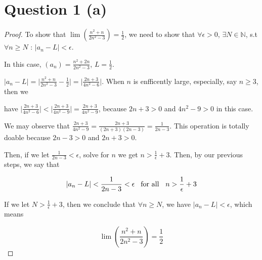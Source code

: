 \documentclass[12pt]{article}
\begin{document}
\doublespacing

\section*{Question 1 (a)}

\begin{proof}
    To show that $\displaystyle{ \lim \left( \frac{n^2+n}{2n^2-3}
    \right) = \frac{1}{2}}$, we need to show that $\forall 
    \epsilon > 0$, $\exists N \in \mathbb{N} $, s.t 
    $\forall n \geq N$ : $ \displaystyle{\vert a_n -
    L \vert < \epsilon }$. 
    
    \vspace*{0.3cm}
    In this case, 
    $\displaystyle{(a_n) = \frac{n^2+2n}{2n^2-3}}$,
    $\displaystyle{L = \frac{1}{2}}$.

    
    \vspace*{0.3cm}
    $ \displaystyle{ \vert a_n - L \vert = 
    \bigg \vert \frac{n^2+n}{2n^2-3} - \frac{1}{2} \bigg \vert = 
    \bigg \vert \frac{2n+3}{4n^2-6} \bigg \vert }$.
    When $n$ is enfficently large, especially, say $n \geq 3$,
    then we 
    
    \vspace*{0.3cm}
    have $\displaystyle{ \bigg \vert \frac{2n+3}{4n^2-6} 
    \bigg \vert < \bigg\vert \frac{2n+3}{4n^2-9} \bigg\vert
    = \frac{2n+3}{4n^2-9}}$, because $2n+3 > 0$ and $
    4n^2 - 9 > 0$ in this case.

    \vspace*{0.3cm}
    We may observe that $\displaystyle{\frac{2n+3}{4n^2-9} = \frac{2n+3}
    {(2n+3)(2n-3)} = \frac{1}{2n-3}}$. This operation is totally
    doable because $2n-3>0$ and $2n+3>0$.

    \vspace*{0.3cm}
    Then, if we let $\displaystyle{\frac{1}{2n-3} < \epsilon}$,
    solve for $n$ we get $\displaystyle{ n >
    \frac{1}{\epsilon} + 3}$. Then, by our previous steps,
    we say that

    \[ \displaystyle{
        \vert a_n - L \vert < \frac{1}{2n-3} < \epsilon \hspace*{0.3cm}
        \text{for all } \hspace*{0.2cm} n > \frac{1}{\epsilon}+3
    }\]

    If we let $\displaystyle{N > \frac{1}{\epsilon}+3}$, then
    we conclude that $\forall n \geq N$, we have 
    $ \vert a_n - L \vert < \epsilon$, which means

    \[ \displaystyle{\lim \left( \frac{n^2+n}{2n^2-3} \right)
    = \frac{1}{2}} \]


\end{proof}
\end{document}
